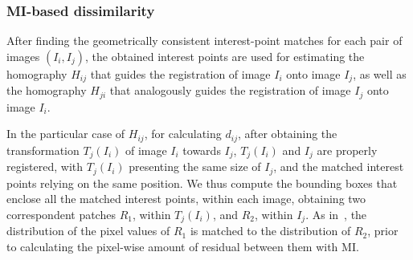 

\vspace{0.2cm}
\subsubsection*{MI-based dissimilarity}
After finding the geometrically consistent interest-point matches for each pair of images $(I_i, I_j)$, the obtained interest points are used for estimating the homography $H_{ij}$ that guides the registration of image $I_i$ onto image $I_j$, as well as the homography $H_{ji}$ that analogously guides the registration of image $I_j$ onto image $I_i$.

In the particular case of $H_{ij}$, for calculating $d_{ij}$, after obtaining the transformation $T_j(I_i)$ of image $I_i$ towards $I_j$, $T_j(I_i)$ and $I_j$ are properly registered, with $T_j(I_i)$ presenting the same size of $I_j$, and the matched interest points relying on the same position.
We thus compute the bounding boxes that enclose all the matched interest points, within each image, obtaining two correspondent patches $R_1$, within $T_j(I_i)$, and $R_2$, within $I_j$.
As in~\cite{bharati2017uphy}, the distribution of the pixel values of $R_1$ is matched to the distribution of $R_2$, prior to calculating the pixel-wise amount of residual between them with MI.

